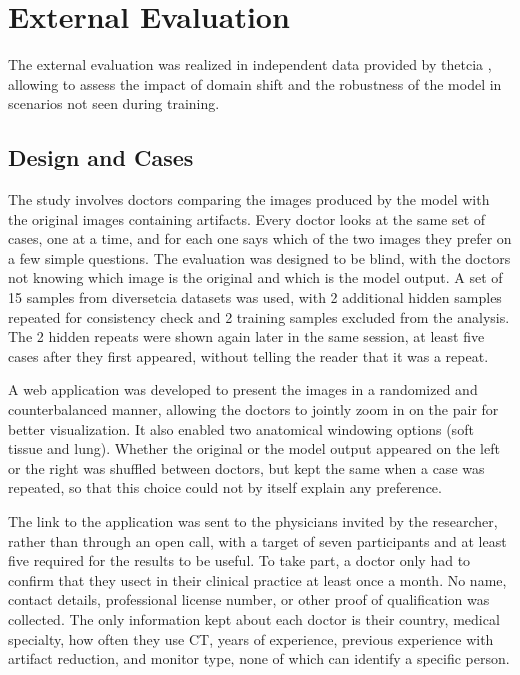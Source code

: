 \section{External Evaluation}
\label{sec:avaliacao-medicos}

The external evaluation was realized in independent data provided by the\acrfull{tcia} \cite{clarkCancerImagingArchive2013}, allowing to assess the impact of domain shift and the robustness of the model in scenarios not seen during training.

\subsection{Design and Cases}

The study involves doctors comparing the images produced by the model with the original images containing artifacts. Every doctor looks at the same set of cases, one at a time, and for each one says which of the two images they prefer on a few simple questions. The evaluation was designed to be blind, with the doctors not knowing which image is the original and which is the model output. A set of 15 samples from diverse\acrshort{tcia} datasets was used, with 2 additional hidden samples repeated for consistency check and 2 training samples excluded from the analysis. The 2 hidden repeats were shown again later in the same session, at least five cases after they first appeared, without telling the reader that it was a repeat.

A web application was developed to present the images in a randomized and counterbalanced manner, allowing the doctors to jointly zoom in on the pair for better visualization. It also enabled two anatomical windowing options (soft tissue and lung). Whether the original or the model output appeared on the left or the right was shuffled between doctors, but kept the same when a case was repeated, so that this choice could not by itself explain any preference.

The link to the application was sent to the physicians invited by the researcher, rather than through an open call, with a target of seven participants and at least five required for the results to be useful. To take part, a doctor only had to confirm that they use\acrshort{ct} in their clinical practice at least once a month. No name, contact details, professional license number, or other proof of qualification was collected. The only information kept about each doctor is their country, medical specialty, how often they use CT, years of experience, previous experience with artifact reduction, and monitor type, none of which can identify a specific person.

